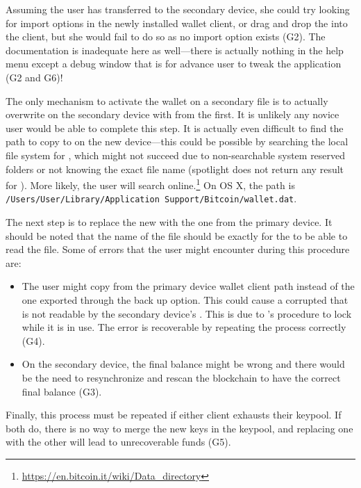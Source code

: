 Assuming the user has transferred \walletfile to the secondary device, she could try looking for import options in the newly installed wallet client, or drag and drop the \walletfile into the client, but she would fail to do so as no import option exists (G2). The documentation is inadequate here as well---there is actually nothing in the help menu except a debug window that is for advance user to tweak the application (G2 and G6)!

The only mechanism to activate the wallet on a secondary file is to actually overwrite \walletfile on the secondary device with \walletfile from the first. It is unlikely any novice user would be able to complete this step. It is actually even difficult to find the path to copy \walletfile to on the new device---this could be possible by searching the local file system for \walletfile, which might not succeed due to non-searchable system reserved folders or not knowing the exact file name (spotlight does not return any result for \walletfile). More likely, the user will search online.\footnote{\url{https://en.bitcoin.it/wiki/Data_directory}} On OS X, the path is \texttt{/Users/User/Library/Application Support/Bitcoin/wallet.dat}.

The next step is to replace the new \walletfile with the one from the primary device. It should be noted that the name of the file should be exactly \walletfile for the \bitcoinclient to be able to read the file. Some of errors that the user might encounter during this procedure are:
\begin{itemize}
	\item The user might copy \walletfile from the primary device wallet client path instead of the one exported through the back up option. This could cause a corrupted \walletfile that is not readable by the secondary device's \bitcoinclient. This is due to \bitcoinclient's procedure to lock \walletfile while it is in use. The error is recoverable by repeating the process correctly (G4). 
	\item On the secondary device, the final balance might be wrong and there would be the need to resynchronize and rescan the blockchain to have the correct final balance (G3).
\end{itemize}

Finally, this process must be repeated if either client exhausts their keypool. If both do, there is no way to merge the new keys in the keypool, and replacing one \walletfile with the other will lead to unrecoverable funds (G5). 

